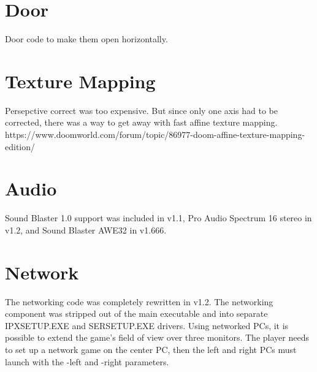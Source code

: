 \section{Door}
Door code to make them open horizontally.
\section{Texture Mapping}
Persepctive correct was too expensive. But since only one axis had to be corrected, there was a way to get away with fast affine texture mapping.\\
https://www.doomworld.com/forum/topic/86977-doom-affine-texture-mapping-edition/\\
\par
\section{Audio}
Sound Blaster 1.0 support was included in v1.1, Pro Audio Spectrum 16 stereo in v1.2, and Sound Blaster AWE32 in v1.666.

\section{Network}
The networking code was completely rewritten in v1.2. The networking component was stripped out of the main executable and into separate IPXSETUP.EXE and SERSETUP.EXE drivers. Using networked PCs, it is possible to extend the game's field of view over three monitors. The player needs to set up a network game on the center PC, then the left and right PCs must launch with the -left and -right parameters. 